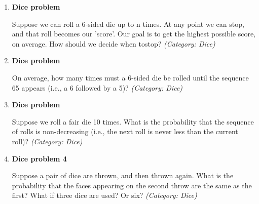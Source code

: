\begin{enumerate}

\item \textbf{Dice problem}

Suppose we can roll a 6-sided die up to n times. At any point we can stop, and that roll becomes our 'score'. Our goal is to get the highest possible score, on average. How should we decide when tostop?
\small\emph{(Category: Dice)}




\item \textbf{Dice problem}

On average, how many times must a 6-sided die be rolled until the sequence 65 appears (i.e., a 6 followed by a 5)?
\small\emph{(Category: Dice)}




\item \textbf{Dice problem}

Suppose we roll a fair die 10 times. What is the probability that the sequence of rolls is non-decreasing (i.e., the next roll is never less than the current roll)?
\small\emph{(Category: Dice)}


\item \textbf{Dice problem 4}

Suppose a pair of dice are thrown, and then thrown again. What is the probability that the faces appearing on the second throw are the same as the first? What if three dice are used? Or six?
\small\emph{(Category: Dice)}


\end{enumerate}
\newpage
